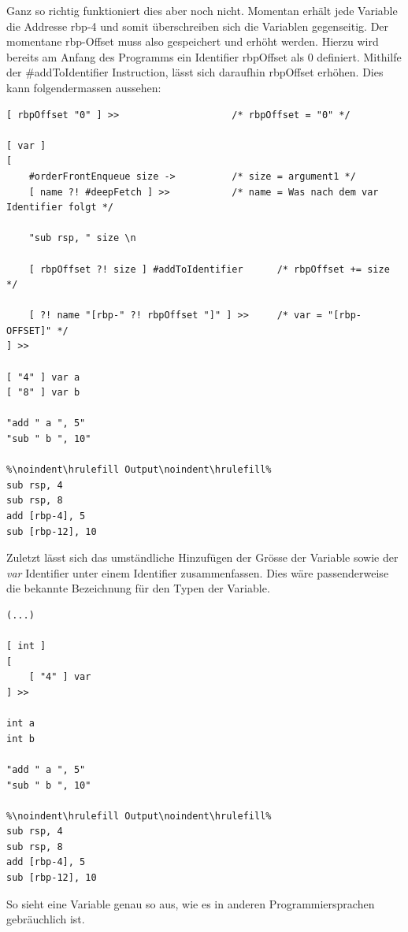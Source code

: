 Ganz so richtig funktioniert dies aber noch nicht. Momentan erhält jede Variable die Addresse rbp-4 und somit überschreiben sich die Variablen gegenseitig. Der momentane rbp-Offset muss also gespeichert und erhöht werden.
Hierzu wird bereits am Anfang des Programms ein Identifier rbpOffset als 0 definiert. Mithilfe der \#addToIdentifier Instruction, lässt sich daraufhin rbpOffset erhöhen. Dies kann folgendermassen aussehen:

\begin{minipage}{\linewidth}
\begin{lstlisting}[language=QHS, caption=Definition einer Variable mit rbpOffset]
[ rbpOffset "0" ] >>                    /* rbpOffset = "0" */

[ var ]
[
    #orderFrontEnqueue size ->          /* size = argument1 */
    [ name ?! #deepFetch ] >>           /* name = Was nach dem var Identifier folgt */

    "sub rsp, " size \n

    [ rbpOffset ?! size ] #addToIdentifier      /* rbpOffset += size */

    [ ?! name "[rbp-" ?! rbpOffset "]" ] >>     /* var = "[rbp-OFFSET]" */
] >> 

[ "4" ] var a 
[ "8" ] var b 

"add " a ", 5"
"sub " b ", 10"
    
%\noindent\hrulefill Output\noindent\hrulefill%
sub rsp, 4
sub rsp, 8
add [rbp-4], 5
sub [rbp-12], 10
\end{lstlisting}
\end{minipage}

Zuletzt lässt sich das umständliche Hinzufügen der Grösse der Variable sowie der \textit{var} Identifier unter einem Identifier zusammenfassen. Dies wäre passenderweise die bekannte Bezeichnung für den Typen der Variable.

\begin{lstlisting}[language=QHS, caption=Definition einer Variable mit \textit{int} Identifier]
(...)

[ int ] 
[
    [ "4" ] var
] >>
    
int a 
int b 
    
"add " a ", 5"
"sub " b ", 10"
        
%\noindent\hrulefill Output\noindent\hrulefill%
sub rsp, 4
sub rsp, 8
add [rbp-4], 5
sub [rbp-12], 10
\end{lstlisting}

So sieht eine Variable genau so aus, wie es in anderen Programmiersprachen gebräuchlich ist.

